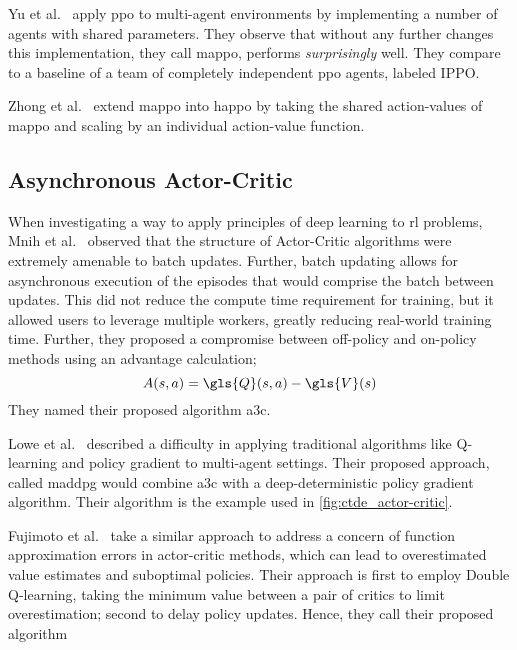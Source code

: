 Yu et al.~\cite*{yu2022} apply \gls{ppo} to multi-agent environments
by implementing a number of agents with shared parameters.
They observe that without any further changes this implementation,
they call \gls{mappo}, performs \emph{surprisingly} well.
They compare to a baseline of a team of completely independent 
\gls{ppo} agents, labeled IPPO.

Zhong et al.~\cite{zhong2024} extend \gls{mappo} 
into \gls{happo} by taking the shared action-values of 
\gls{mappo} and scaling by an individual action-value function.




\subsection*{Asynchronous Actor-Critic}

When investigating a way to apply principles of deep learning to \gls{rl}
problems, Mnih et al.~\cite{mnih2016} observed that the structure of
Actor-Critic algorithms were extremely amenable to batch updates.
Further, batch updating allows for asynchronous execution of 
the episodes that would comprise the batch between updates.
This did not reduce the compute time requirement for training, 
but it allowed users to leverage multiple workers, 
greatly reducing real-world training time.
Further, they proposed a compromise between off-policy and on-policy
methods using an advantage calculation;
\begin{equation}
    A(s,a) = \gls{Q}(s,a) - \gls{V}(s)
\end{equation}
They named their proposed algorithm \gls{a3c}.

Lowe et al.~\cite{lowe2020} described a difficulty in applying traditional 
algorithms like Q-learning and policy gradient to multi-agent settings.
Their proposed approach, called \gls{maddpg} would combine \gls{a3c} 
with a deep-deterministic policy gradient algorithm.
Their algorithm is the example used in \cref{fig:ctde_actor-critic}.

Fujimoto et al.~\cite{fujimoto2018} take a similar approach to address 
a concern of function approximation errors in actor-critic methods, 
which can lead to overestimated value estimates and suboptimal policies.
Their approach is first to employ Double Q-learning, taking the 
minimum value between a pair of critics to limit overestimation;
second to delay policy updates.
Hence, they call their proposed algorithm 




